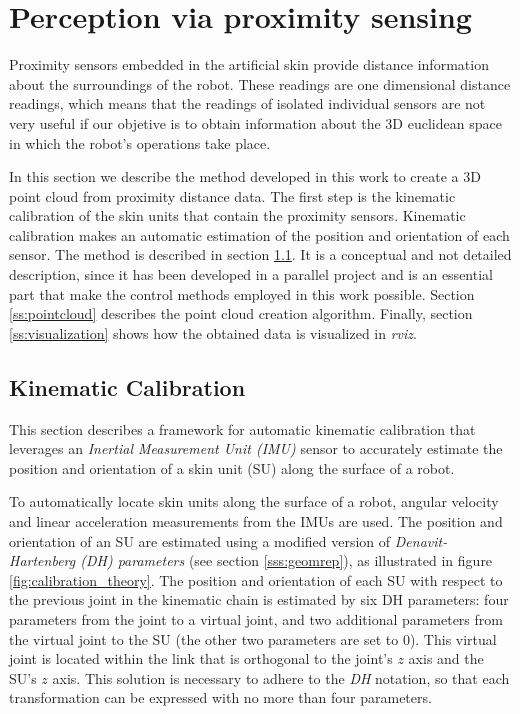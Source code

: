 \section{Perception via proximity sensing}
\label{s:perception}

Proximity sensors embedded in the artificial skin provide distance information about the surroundings of the robot. These readings are one dimensional distance readings, which means that the readings of isolated individual sensors are not very useful if our objetive is to obtain information about the 3D euclidean space in which the robot's operations take place.

In this section we describe the method developed in this work to create a 3D point cloud from proximity distance data. The first step is the kinematic calibration of the skin units that contain the proximity sensors. Kinematic calibration makes an automatic estimation of the position and orientation of each sensor. The method is described in section \ref{ss:calibration}. It is a conceptual and not detailed description, since it has been developed in a parallel project and is an essential part that make the control methods employed in this work possible. Section \ref{ss:pointcloud} describes the point cloud creation algorithm. Finally, section \ref{ss:visualization} shows how the obtained data is visualized in \textit{rviz}.

\subsection{Kinematic Calibration}
\label{ss:calibration}

This section describes a framework for automatic kinematic calibration that leverages an
\textit{Inertial Measurement Unit (IMU)} sensor to accurately estimate the position and orientation of a skin unit (SU) along the surface of a robot.

To automatically locate skin units along the surface of a robot, angular velocity and linear acceleration measurements from the IMUs are used. The position and orientation of an SU are estimated
using a modified version of \textit{Denavit-Hartenberg (DH) parameters} (see section \ref{sss:geomrep}), as illustrated in figure \ref{fig:calibration_theory}.
The position and orientation of each SU with respect to the previous
joint in the kinematic chain is estimated by six DH parameters: four parameters from the joint to a virtual joint,
and two additional parameters from the virtual joint to the SU (the other two parameters are set to $0$). This virtual joint is located within the link that is orthogonal to the joint’s $z$ axis and the SU’s $z$ axis.
This solution is necessary to adhere to the \textit{DH} notation,
so that each transformation can be expressed with no more than four parameters.


